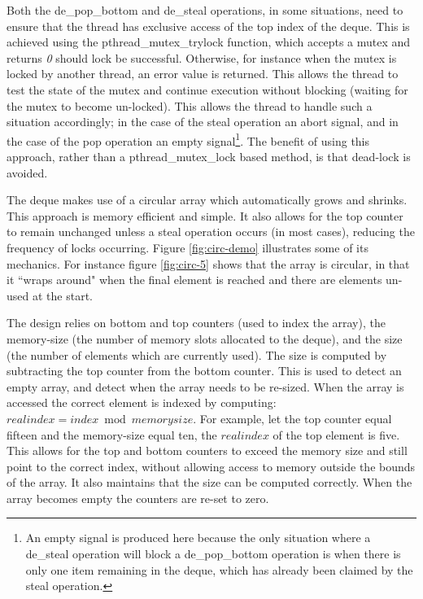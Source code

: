 Both the de\_pop\_bottom and de\_steal operations, in some situations, need to ensure that the thread has exclusive access of the 
top index of the deque.
This is achieved using the pthread\_mutex\_trylock function, which accepts a mutex and returns \textit{0} should lock be successful.
Otherwise, for instance when the mutex is locked by another thread, an error value is returned. This allows the thread to test the 
state of the mutex and continue execution without blocking (waiting for the mutex to become un-locked).
This allows the thread to handle such a situation accordingly; in the case of the steal operation an abort signal, and in the case
of the pop operation an empty signal\footnote{An empty signal is produced here because the only situation where a de\_steal operation will block 
a de\_pop\_bottom operation is when there is only one item remaining in the deque, which has already been claimed by the steal operation.}.
The benefit of using this approach, rather than a pthread\_mutex\_lock based method, is that \gls{dead-lock} is avoided.



The deque makes use of a \gls{circular array} which automatically grows and shrinks.
This approach is memory efficient and simple. 
It also allows for the top counter to remain unchanged unless a steal operation occurs (in most cases), reducing the frequency of locks occurring.
Figure \ref{fig:circ-demo} illustrates some of its mechanics. For instance figure \ref{fig:circ-5} shows that the array is circular, in that it
``wraps around" when the final element is reached and there are elements un-used at the start.

The design relies on bottom and top counters (used to index the array), the memory-size (the number of memory slots allocated to the deque), and 
the size (the number of elements which are currently used). The size is computed by subtracting the top counter from the bottom counter. 
This is used to detect an empty array, and detect when the array needs to be re-sized.
When the array is accessed the correct element is indexed by computing: \(realindex = index \bmod memorysize \). 
For example, let the top counter equal fifteen and the memory-size equal ten, the \(realindex\) of the top element is five.
This allows for the top and bottom counters to exceed the memory size and still point to the correct index, without allowing access to memory outside the 
bounds of the array. It also maintains that the size can be computed correctly. When the array becomes empty the counters are re-set to zero.

